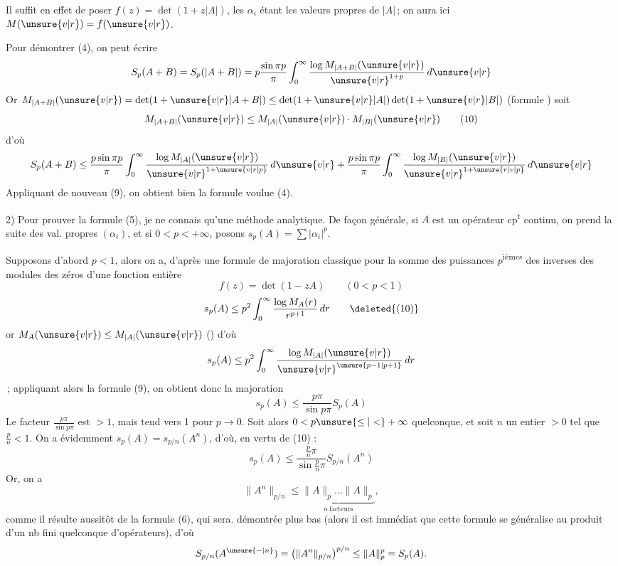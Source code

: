 Il suffit en effet de poser $f(z)=\det(1+z|A|)$,
les $\alpha_i$ étant les valeurs propres de $|A|$\,; on aura
ici $M(\unsure{v|r})=f(\unsure{v|r})$.

Pour démontrer (4), on  peut écrire
\[
S_p(A+B)=S_p(|A+B|)=p\frac{\sin\pi p}{\pi}\int_0^\infty
\frac{\log M_{|A+B|}(\unsure{v|r})}{{\unsure{v|r}}^{1+p}}\,d\unsure{v|r}
\]
Or $M_{|A+B|}(\unsure{v|r})=\det(1+\unsure{v|r}|A+B|)\leq\det(1+\unsure{v|r}|A|)\det(1+\unsure{v|r}|B|)$
(formule \unsure{\ldots})  soit
\[
M_{|A+B|}(\unsure{v|r})\leq M_{|A|}(\unsure{v|r})\cdot M_{|B|}(\unsure{v|r})\tag*{(10)}
\]
d'où
\[
S_p(A+B)\leq\frac{p\sin\pi p}{\pi}\int_0^\infty\frac{\log M_{|A|}(\unsure{v|r})}{{\unsure{v|r}}^{1+\unsure{v|r|p}}}\,d\unsure{v|r}
+\frac{p\sin\pi p}{\pi}\int_0^\infty\frac{\log M_{|B|}(\unsure{v|r})}{{\unsure{v|r}}^{1+\unsure{r|v|p}}}\,d\unsure{v|r}
\]
Appliquant de nouveau (9), on obtient bien la
formule voulue (4).


2) Pour prouver la formule (5), je ne connais
qu'une méthode analytique. De façon générale,
 si $A$ est un opérateur cp\textsuperscript{t} continu, on prend la
suite des val. propres $(\alpha_i)$,  et si
$0<p<+\infty$, posons $s_p(A)=\sum|\alpha_i|^p$.

Supposons d'abord $p<1$, alors on a, d'après
une formule de majoration classique pour la
somme des puissances $p$\textsuperscript{ièmes} des inverses des
modules des zéros d'une fonction entière
\[
f(z)=\det(1-zA)\qquad(0<p<1)
\]
\[
s_p(A)\leq p^2\int_0^\infty\frac{\log M_A(r)}{r^{p+1}}\,dr\tag*{\deleted{(10)}}
\]
or $M_A(\unsure{v|r})\leq M_{|A|}(\unsure{v|r})$ (\unsure{\ldots\ --\ --}) d'où
\[
s_p(A)\leq p^2\int_0^\infty\frac{\log M_{|A|}(\unsure{v|r})}{{\unsure{v|r}}^{\unsure{p-1|p+1}}}\,dr
\]
\,; appliquant alors la formule
(9), on obtient donc la majoration
\[
s_p(A)\leq\frac{p\pi}{\sin p\pi}S_p(A)\tag*{(10)}
\]
Le facteur $\frac{p\pi}{\sin p\pi}$ est $>1$, mais tend vers 1
pour $p\to0$. Soit alors $0<p\unsure{\leq|<}+\infty$ quelconque,
et soit $n$ un entier $>0$ tel que $\frac{p}{n}<1$.
On a évidemment $s_p(A)=s_{p/n}(A^n)$, d'où, en
vertu de (10) :
\[
s_p(A)\leq\frac{\frac{p}{n}\pi}{\sin\frac{p}{n}\pi}S_{p/n}(A^n)
\]
Or, on a 
\[
\|A^n\|_{p/n}\leq\underbrace{\|A\|_p\ldots\|A\|_p}_{n\ \text{facteurs}},
\]
comme il résulte aussitôt de la formule (6), qui sera.
démontrée plus bas (alors il est immédiat
que cette formule se généralise au produit d'un
nb fini quelconque d'opérateurs), d'où
\[
S_{p/n}(A^{\unsure{{-}|n}})=\left(\|A^n\|_{p/n}\right)^{p/n}
\leq\|A\|_p^p=S_p(A).
\]

